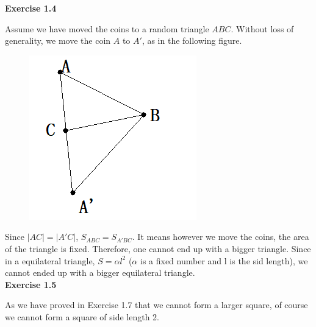 \documentclass{article} %
\begin{document}
	\textbf{Exercise 1.4}\par
	Assume we have moved the coins to a random triangle $ABC$. Without loss of generality, we move the coin $A$ to $A'$, as in the following figure.
	\begin{figure}[H]
	\centering
	\includegraphics[scale=0.6]{1-3.png}
		\caption{}
		\label{fig:4}
	\end{figure}
	Since $|AC|=|A'C|$, $S_{ABC}=S_{A'BC}$. It means however we move the coins, the area of the triangle is fixed. Therefore, one cannot end up with a bigger triangle. Since in a equilateral triangle, $S=\alpha l^2$ ($\alpha$ is a fixed number and l is the sid length), we cannot ended up with a bigger equilateral triangle.\\
	
	\textbf{Exercise 1.5}\par
	As we have proved in Exercise 1.7 that we cannot form a larger square, of course we cannot form a square of side length 2.\\
	
\end{document}

